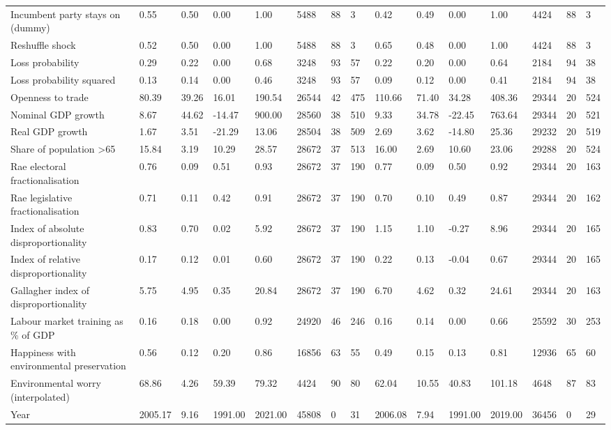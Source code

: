 \begin{longtable}{lllllllllllllll}
Incumbent party stays on (dummy) & 0.55 & 0.50 & 0.00 & 1.00 & 5488 & 88 & 3 & 0.42 & 0.49 & 0.00 & 1.00 & 4424 & 88 & 3\\
Reshuffle shock & 0.52 & 0.50 & 0.00 & 1.00 & 5488 & 88 & 3 & 0.65 & 0.48 & 0.00 & 1.00 & 4424 & 88 & 3\\
\addlinespace
Loss probability & 0.29 & 0.22 & 0.00 & 0.68 & 3248 & 93 & 57 & 0.22 & 0.20 & 0.00 & 0.64 & 2184 & 94 & 38\\
Loss probability squared & 0.13 & 0.14 & 0.00 & 0.46 & 3248 & 93 & 57 & 0.09 & 0.12 & 0.00 & 0.41 & 2184 & 94 & 38\\
Openness to trade & 80.39 & 39.26 & 16.01 & 190.54 & 26544 & 42 & 475 & 110.66 & 71.40 & 34.28 & 408.36 & 29344 & 20 & 524\\
Nominal GDP growth & 8.67 & 44.62 & -14.47 & 900.00 & 28560 & 38 & 510 & 9.33 & 34.78 & -22.45 & 763.64 & 29344 & 20 & 521\\
Real GDP growth & 1.67 & 3.51 & -21.29 & 13.06 & 28504 & 38 & 509 & 2.69 & 3.62 & -14.80 & 25.36 & 29232 & 20 & 519\\
\addlinespace
Share of population >65 & 15.84 & 3.19 & 10.29 & 28.57 & 28672 & 37 & 513 & 16.00 & 2.69 & 10.60 & 23.06 & 29288 & 20 & 524\\
Rae electoral fractionalisation & 0.76 & 0.09 & 0.51 & 0.93 & 28672 & 37 & 190 & 0.77 & 0.09 & 0.50 & 0.92 & 29344 & 20 & 163\\
Rae legislative fractionalisation & 0.71 & 0.11 & 0.42 & 0.91 & 28672 & 37 & 190 & 0.70 & 0.10 & 0.49 & 0.87 & 29344 & 20 & 162\\
Index of absolute disproportionality & 0.83 & 0.70 & 0.02 & 5.92 & 28672 & 37 & 190 & 1.15 & 1.10 & -0.27 & 8.96 & 29344 & 20 & 165\\
Index of relative disproportionality & 0.17 & 0.12 & 0.01 & 0.60 & 28672 & 37 & 190 & 0.22 & 0.13 & -0.04 & 0.67 & 29344 & 20 & 165\\
\addlinespace
Gallagher index of disproportionality & 5.75 & 4.95 & 0.35 & 20.84 & 28672 & 37 & 190 & 6.70 & 4.62 & 0.32 & 24.61 & 29344 & 20 & 163\\
Labour market training as \% of GDP & 0.16 & 0.18 & 0.00 & 0.92 & 24920 & 46 & 246 & 0.16 & 0.14 & 0.00 & 0.66 & 25592 & 30 & 253\\
Happiness with environmental preservation & 0.56 & 0.12 & 0.20 & 0.86 & 16856 & 63 & 55 & 0.49 & 0.15 & 0.13 & 0.81 & 12936 & 65 & 60\\
Environmental worry (interpolated) & 68.86 & 4.26 & 59.39 & 79.32 & 4424 & 90 & 80 & 62.04 & 10.55 & 40.83 & 101.18 & 4648 & 87 & 83\\
Year & 2005.17 & 9.16 & 1991.00 & 2021.00 & 45808 & 0 & 31 & 2006.08 & 7.94 & 1991.00 & 2019.00 & 36456 & 0 & 29\\
\bottomrule
\end{longtable}
